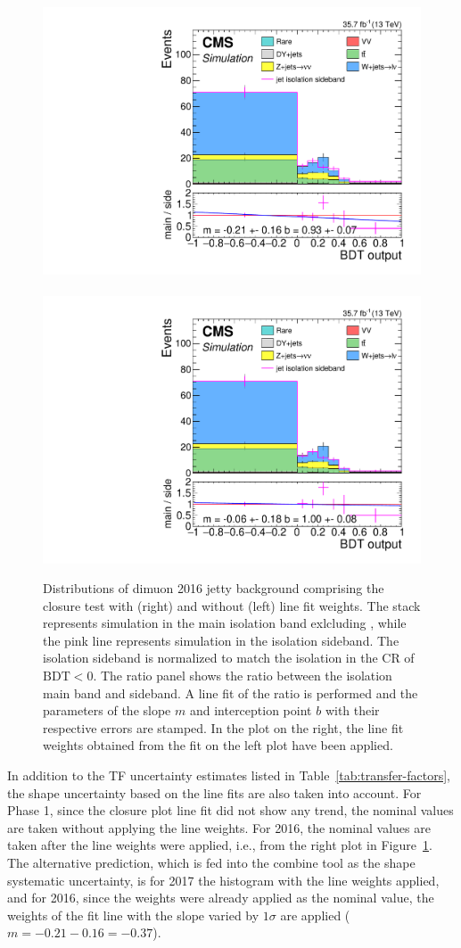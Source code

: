\begin{figure}[!htb]
\centering
\includegraphics[width=0.48\linewidth]{plots/dilepton_muons_bg_isocr_no_retag_CorrJetNoMultIso10_06_2016_no_norm_sf/none_closure_dilepBDTphase1CorrJetNoMultIso10Dr0.6.pdf} \,
\includegraphics[width=0.48\linewidth]{plots/dilepton_muons_bg_isocr_no_retag_CorrJetNoMultIso10_06_2016_no_norm_sf_line_fit_line_weights/none_closure_dilepBDTphase1CorrJetNoMultIso10Dr0.6.pdf} 
 \\

\caption[Dimuon 2016 jetty background closure plots with and without fit line weights]{Distributions of dimuon 2016 jetty background comprising the closure test with (right) and without (left) line fit weights. The stack represents simulation in the main isolation band exlcluding \ztautau, while the pink line represents simulation in the isolation sideband. The isolation sideband is normalized to match the isolation in the CR of $\mathrm{BDT} < 0$. The ratio panel shows the ratio between the isolation main band and sideband. A line fit of the ratio is performed and the parameters of the slope $m$ and interception point $b$ with their respective errors are stamped. In the plot on the right, the line fit weights obtained from the fit on the left plot have been applied.}
\label{fig:dimuon-bdt-jetty-2016-closure}
\end{figure}

In addition to the TF uncertainty estimates listed in Table~\ref{tab:transfer-factors}, the shape uncertainty based on the line fits are also taken into account. For Phase 1, since the closure plot line fit did not show any trend, the nominal values are taken without applying the line weights. For 2016, the nominal values are taken after the line weights were applied, i.e., from the right plot in Figure~\ref{fig:dimuon-bdt-jetty-2016-closure}. The alternative prediction, which is fed into the combine tool as the shape systematic uncertainty, is for 2017 the histogram with the line weights applied, and for 2016, since the weights were already applied as the nominal value, the weights of the fit line with the slope varied by $1\sigma$ are applied ($m= -0.21 - 0.16= -0.37$).


